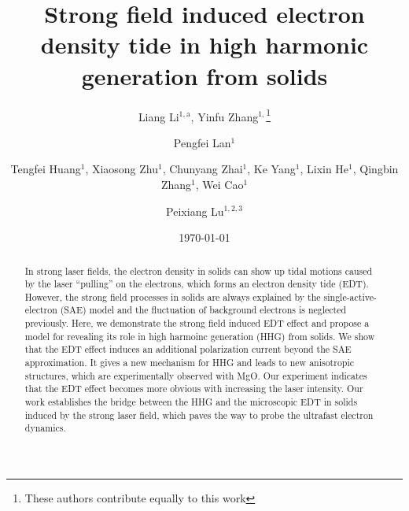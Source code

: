 \documentclass[aps,prl,10pt,preprint,nofootinbib]{revtex4-1}
\begin{document}

\title{Strong field induced electron density tide in high harmonic generation from solids}

\author{Liang Li$^{1,\text{a}}$, Yinfu Zhang$^{1,}$\footnote{These authors contribute equally to this work}}
\author{Pengfei Lan$^{1}$}
\author{ Tengfei Huang$^{1}$, Xiaosong Zhu$^{1}$, Chunyang Zhai$^{1}$, Ke Yang$^{1}$, Lixin He$^{1}$, Qingbin Zhang$^{1}$, Wei Cao$^{1}$}
\author{Peixiang Lu$^{1,2,3}$}




\date{\today}%

\begin{abstract}
In strong laser fields, the electron density in solids can show up tidal motions caused by the laser ``pulling'' on the electrons, which forms an electron density tide (EDT). However, the strong field processes in solids are always explained by the single-active-electron (SAE) model and the fluctuation of background electrons is neglected previously. Here, we demonstrate the strong field induced EDT effect and propose a model for revealing its role in high harmoinc generation (HHG) from solids. We show that the EDT effect induces an additional polarization current beyond the SAE approximation. It gives a new mechanism for HHG and leads to new anisotropic structures, which are experimentally observed with MgO. Our experiment indicates that the EDT effect becomes more obvious with increasing the laser intensity. Our work establishes the bridge between the HHG and the microscopic EDT in solids induced by the strong laser field, which paves the way to probe the ultrafast electron dynamics.
\end{abstract}


\maketitle
\end{document}
